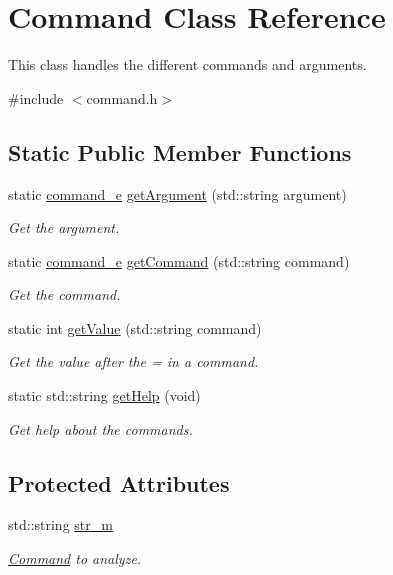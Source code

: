 \hypertarget{class_command}{}\section{Command Class Reference}
\label{class_command}


This class handles the different commands and arguments.  




{\ttfamily \#include $<$command.\+h$>$}

\subsection*{Static Public Member Functions}
\begin{DoxyCompactItemize}
\item 
static \hyperlink{command_8h_aafce48252f7b3163fa15e458dd84ba12}{command\+\_\+e} \hyperlink{class_command_ae11f4e8caf8655b98791f0a2f779d245}{get\+Argument} (std\+::string argument)
\begin{DoxyCompactList}\small\item\em Get the argument. \end{DoxyCompactList}\item 
static \hyperlink{command_8h_aafce48252f7b3163fa15e458dd84ba12}{command\+\_\+e} \hyperlink{class_command_a0a461c50ca91c39c699d35da1ae4d66d}{get\+Command} (std\+::string command)
\begin{DoxyCompactList}\small\item\em Get the command. \end{DoxyCompactList}\item 
static int \hyperlink{class_command_a08b18f7dba9ce77a466fd92c5617d927}{get\+Value} (std\+::string command)
\begin{DoxyCompactList}\small\item\em Get the value after the = in a command. \end{DoxyCompactList}\item 
static std\+::string \hyperlink{class_command_a533d4d8df620c9dd0c36c4d67a379ae5}{get\+Help} (void)
\begin{DoxyCompactList}\small\item\em Get help about the commands. \end{DoxyCompactList}\end{DoxyCompactItemize}
\subsection*{Protected Attributes}
\begin{DoxyCompactItemize}
\item 
\hypertarget{class_command_a42400397858e26d0130e6eb7db208126}{}std\+::string \hyperlink{class_command_a42400397858e26d0130e6eb7db208126}{str\+\_\+m}\label{class_command_a42400397858e26d0130e6eb7db208126}

\begin{DoxyCompactList}\small\item\em \hyperlink{class_command}{Command} to analyze. \end{DoxyCompactList}\end{DoxyCompactItemize}



